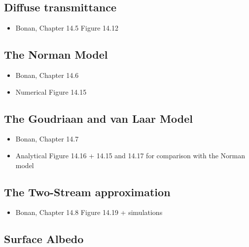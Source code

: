 \documentclass[
  oneside]{book}
\providecommand{\tightlist}{%
  \setlength{\itemsep}{0pt}\setlength{\parskip}{0pt}}
\begin{document}
\hypertarget{diffuse-transmittance}{%
\subsection{Diffuse transmittance}\label{diffuse-transmittance}}

\begin{itemize}
\tightlist
\item
  Bonan, Chapter 14.5
  Figure 14.12
\end{itemize}

\hypertarget{the-norman-model}{%
\subsection{The Norman Model}\label{the-norman-model}}

\begin{itemize}
\tightlist
\item
  Bonan, Chapter 14.6
\item
  Numerical
  Figure 14.15
\end{itemize}

\hypertarget{the-goudriaan-and-van-laar-model}{%
\subsection{The Goudriaan and van Laar Model}\label{the-goudriaan-and-van-laar-model}}

\begin{itemize}
\tightlist
\item
  Bonan, Chapter 14.7
\item
  Analytical
  Figure 14.16 + 14.15 and 14.17 for comparison with the Norman model
\end{itemize}

\hypertarget{the-two-stream-approximation}{%
\subsection{The Two-Stream approximation}\label{the-two-stream-approximation}}

\begin{itemize}
\tightlist
\item
  Bonan, Chapter 14.8
  Figure 14.19 + simulations
\end{itemize}

\hypertarget{surface-albedo}{%
\subsection{Surface Albedo}\label{surface-albedo}}
\end{document}
